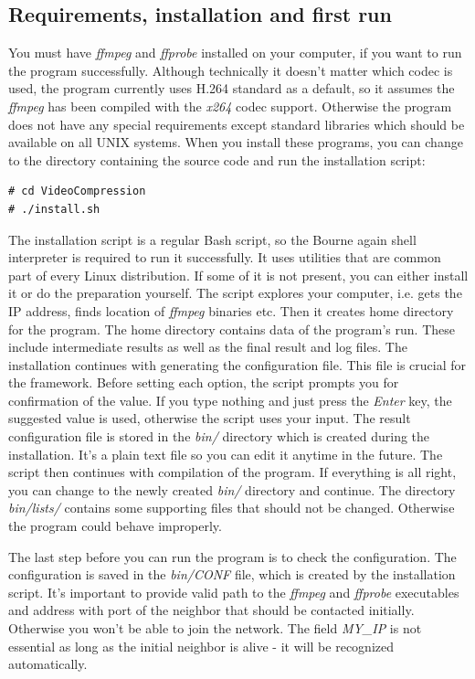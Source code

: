 \subsection*{Requirements, installation and first run}
You must have \textit{ffmpeg} and \textit{ffprobe} installed on your computer, if you want to run the program successfully. Although technically it doesn't matter which codec is used, the program currently uses H.264 standard as a default, so it assumes the \textit{ffmpeg} has been compiled with the \textit{x264} codec support. Otherwise the program does not have any special requirements except standard libraries which should be available on all UNIX systems. When you install these programs, you can change to the directory containing the source code and run the installation script:
\begin{verbatim}
# cd VideoCompression
# ./install.sh
\end{verbatim}
The installation script is a regular Bash script, so the Bourne again shell interpreter is required to run it successfully. It uses utilities that are common part of every Linux distribution. If some of it is not present, you can either install it or do the preparation yourself. The script explores your computer, i.e. gets the IP address, finds location of \textit{ffmpeg} binaries etc. Then it creates home directory for the program. The home directory contains data of the program's run. These include intermediate results as well as the final result and log files. The installation continues with generating the configuration file. This file is crucial for the framework. Before setting each option, the script prompts you for confirmation of the value. If you type nothing and just press the \textit{Enter} key, the suggested value is used, otherwise the script uses your input. The result configuration file is stored in the \textit{bin/} directory which is created during the installation. It's a plain text file so you can edit it anytime in the future. The script then continues with compilation of the program. If everything is all right, you can change to the newly created \textit{bin/} directory and continue. The directory \textit{bin/lists/} contains some supporting files that should not be changed. Otherwise the program could behave improperly.

The last step before you can run the program is to check the configuration. The configuration is saved in the \textit{bin/CONF} file, which is created by the installation script. It's important to provide valid path to the \textit{ffmpeg} and \textit{ffprobe} executables and address with port of the neighbor that should be contacted initially. Otherwise you won't be able to join the network. The field \textit{MY\_IP} is not essential as long as the initial neighbor is alive - it will be recognized automatically. 

